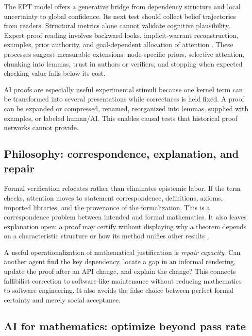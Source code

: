 \documentclass[11pt]{article}
\begin{document}
The EPT model offers a generative bridge from dependency structure and local uncertainty to global
confidence.  Its next test should collect belief trajectories from readers.  Structural metrics
alone cannot validate cognitive plausibility.  Expert proof reading involves backward looks,
implicit-warrant reconstruction, examples, prior authority, and goal-dependent allocation of
attention \citep{weber2008,inglis2012,mejiaramos2014,panse2018}.  These processes suggest measurable
extensions: node-specific priors, selective attention, chunking into lemmas, trust in authors or
verifiers, and stopping when expected checking value falls below its cost.

AI proofs are especially useful experimental stimuli because one kernel term can be transformed
into several presentations while correctness is held fixed.  A proof can be expanded or compressed,
renamed, reorganized into lemmas, supplied with examples, or labeled human/AI.  This enables causal
tests that historical proof networks cannot provide.

\subsection{Philosophy: correspondence, explanation, and repair}

Formal verification relocates rather than eliminates epistemic labor.  If the term checks, attention
moves to statement correspondence, definitions, axioms, imported libraries, and the provenance of
the formalization.  This is a correspondence problem between intended and formal mathematics.  It
also leaves explanation open: a proof may certify without displaying why a theorem depends on a
characteristic structure or how its method unifies other results \citep{mancosu2008,rav1999}.

A useful operationalization of mathematical justification is \emph{repair capacity}.  Can another
agent find the key dependency, locate a gap in an informal rendering, update the proof after an API
change, and explain the change?  This connects fallibilist correction \citep{detoffoli2021} to
software-like maintenance without reducing mathematics to software engineering.  It also avoids
the false choice between perfect formal certainty and merely social acceptance.

\subsection{AI for mathematics: optimize beyond pass rate}
\end{document}
